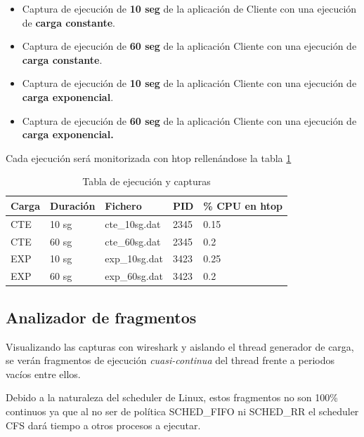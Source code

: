 \documentclass[a4paper,11pt,spanish,twoside]{article}
\begin{document}
\begin{itemize}
\item Captura de ejecución de \textbf{10 seg} de la aplicación de
  Cliente con una ejecución de \textbf{carga constante}.

\item Captura de ejecución de \textbf{60 seg} de la aplicación Cliente
  con una ejecución de \textbf{carga constante}.

\item Captura de ejecución de \textbf{10 seg} de la aplicación Cliente
  con una ejecución de \textbf{carga exponencial}.

\item Captura de ejecución de \textbf{60 seg} de la aplicación Cliente
  con una ejecución de \textbf{carga exponencial.}
\end{itemize}

Cada ejecución será monitorizada con htop rellenándose la tabla \ref{tab:capturas}

\begin{table}[h!]
  \centering
  \begin{tabular}{p{1in}|p{1in}|p{1in}|p{1in}|p{1in}}
    \textbf{Carga} & \textbf{Duración} & \textbf{Fichero} &
    \textbf{PID} & \textbf{\% CPU en htop} \\ \hline
CTE & 10 sg & cte\_10sg.dat & 2345 & 0.15 \\
CTE & 60 sg & cte\_60sg.dat & 2345 & 0.2 \\
EXP & 10 sg & exp\_10sg.dat & 3423 & 0.25 \\
EXP & 60 sg & exp\_60sg.dat & 3423 & 0.2 \\


\end{tabular}
  \caption{Tabla de ejecución y capturas}
  \label{tab:capturas}
\end{table}

\subsection{Analizador de fragmentos}
\label{sec:anafragmentos}

Visualizando las capturas con wireshark y aislando el thread generador
de carga, se verán fragmentos de ejecución \emph{cuasi-continua} del
thread frente a periodos vacíos entre ellos.

Debido a la naturaleza del scheduler de Linux, estos fragmentos no son
100\% continuos ya que al no ser de política SCHED\_FIFO ni SCHED\_RR
el scheduler CFS dará tiempo a otros procesos a ejecutar.
\end{document}
